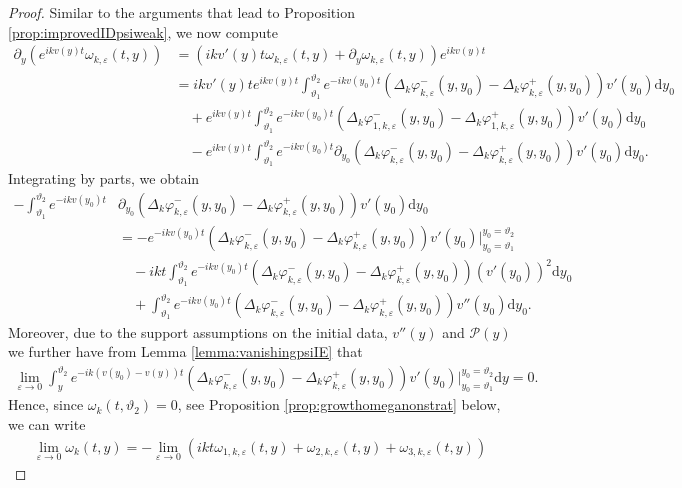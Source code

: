 \documentclass[11pt,reqno]{amsproc}
\theoremstyle{definition}
\numberwithin{equation}{section}
\renewcommand{\d}{\mathrm{d}}
\newcommand{\ep}{\varepsilon}
\renewcommand{\P}{{\mathcal{P}}}
\begin{document}
\begin{proof}
Similar to the arguments that lead to Proposition \ref{prop:improvedIDpsiweak}, we now compute
\begin{align*}
\partial_y \left( e^{ikv(y)t}\omega_{k,\ep}(t,y) \right) &= \left( ikv'(y) t \omega_{k,\ep}(t,y) + \partial_y \omega_{k,\ep}(t,y) \right) e^{ikv(y) t} \\
&=ikv'(y)t e^{ikv(y) t}\int_{\vartheta_1}^{\vartheta_2}e^{-ikv(y_0)t}\left( \Delta_k\varphi_{k,\ep}^-(y,y_0) - \Delta_k\varphi_{k,\ep}^+(y,y_0) \right) v'(y_0) \d y_0 \\
&\quad+ e^{ikv(y)t}\int_{\vartheta_1}^{\vartheta_2}e^{-ikv(y_0)t}\left( \Delta_k\varphi_{1,k,\ep}^-(y,y_0) - \Delta_k\varphi_{1,k,\ep}^+(y,y_0) \right) v'(y_0) \d y_0 \\
&\quad - e^{ikv(y)t}\int_{\vartheta_1}^{\vartheta_2}e^{-ikv(y_0)t} \partial_{y_0}\left( \Delta_k\varphi_{k,\ep}^-(y,y_0) - \Delta_k\varphi_{k,\ep}^+(y,y_0) \right) v'(y_0) \d y_0.
\end{align*}
Integrating by parts, we obtain
\begin{align*}
- \int_{\vartheta_1}^{\vartheta_2}e^{-ikv(y_0)t} &\partial_{y_0}\left( \Delta_k\varphi_{k,\ep}^-(y,y_0) - \Delta_k\varphi_{k,\ep}^+(y,y_0) \right) v'(y_0) \d y_0 \\
&= - e^{-ikv(y_0)t} \left( \Delta_k\varphi_{k,\ep}^-(y,y_0) - \Delta_k\varphi_{k,\ep}^+(y,y_0) \right) v'(y_0) \Big|_{y_0=\vartheta_1}^{y_0=\vartheta_2} \\
&\quad -ikt \int_{\vartheta_1}^{\vartheta_2}e^{-ikv(y_0)t} \left( \Delta_k\varphi_{k,\ep}^-(y,y_0) - \Delta_k\varphi_{k,\ep}^+(y,y_0) \right) (v'(y_0))^2 \d y_0 \\
&\quad + \int_{\vartheta_1}^{\vartheta_2}e^{-ikv(y_0)t} \left( \Delta_k\varphi_{k,\ep}^-(y,y_0) - \Delta_k\varphi_{k,\ep}^+(y,y_0) \right) v''(y_0) \d y_0.
\end{align*}
Moreover, due to the support assumptions on the initial data, $v''(y)$ and $\P(y)$ we further have from Lemma \ref{lemma:vanishingpsiIE} that
\begin{align*}
\lim_{\ep\rightarrow 0}\int_{y}^{\vartheta_2}e^{-ik(v(y_0)-v(y))t} \left( \Delta_k\varphi_{k,\ep}^-(y,y_0) - \Delta_k\varphi_{k,\ep}^+(y,y_0) \right) v'(y_0) \Big|_{y_0=\vartheta_1}^{y_0=\vartheta_2} \d y = 0.
\end{align*}
Hence, since $\omega_k(t,\vartheta_2)=0$, see Proposition \ref{prop:growthomeganonstrat} below, we can write
\begin{align*}
\lim_{\ep\rightarrow 0}\omega_{k}(t,y) = -\lim_{\ep\rightarrow 0} \left( ikt \omega_{1,k,\ep}(t,y) + \omega_{2,k,\ep}(t,y) + \omega_{3,k,\ep}(t,y) \right)

\end{align*}
\end{proof}
\end{document}

